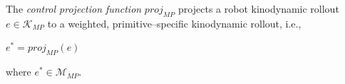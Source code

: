 \begin{definition}\label{def:projection}
The \textsl{control projection function} $proj_{MP}$ projects a robot kinodynamic rollout $e \in \mathcal{K}_{MP}$ to a weighted, primitive--specific kinodynamic rollout, i.e.,

\begin{center}
$e^* = proj_{MP}(e)$
\end{center}

where $e^* \in \mathcal{M}_{MP}$.
\end{definition}
